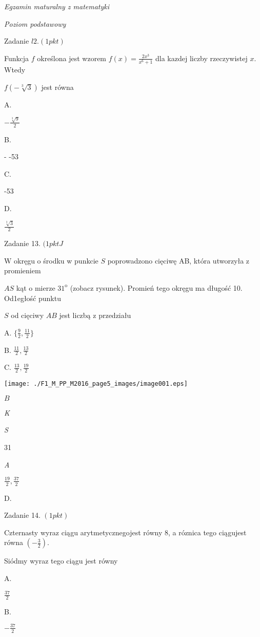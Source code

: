 \documentclass[a4paper,12pt]{article}
\begin{document}
{\it Egzamin maturalny z matematyki}

{\it Poziom podstawowy}

Zadanie $l2. (1pkt)$

Funkcja $f$ określona jest wzorem $f(x)=\displaystyle \frac{2x^{3}}{x^{6}+1}$ dla kazdej liczby rzeczywistej $x$. Wtedy

$f(-\sqrt[3]{3})$ jest równa

A.

$-\displaystyle \frac{\sqrt[3]{9}}{2}$

B.

- -53

C.

-53

D.

$\displaystyle \frac{\sqrt[3]{3}}{2}$

Zadanie 13. $(1pktJ$

$\mathrm{W}$ okręgu o środku w punkcie $S$ poprowadzono cięciwę AB, która utworzyła z promieniem

$AS$ kąt o mierze $31^{\mathrm{o}}$ (zobacz rysunek). Promień tego okręgu ma długość 10. Od1egłość punktu

$S$ od cięciwy $AB$ jest liczbą z przedziału

A. $\displaystyle \{\frac{9}{2},\frac{11}{2}\}$

B. $\displaystyle \frac{11}{2}, \displaystyle \frac{13}{2}$

C. $\displaystyle \frac{13}{2}, \displaystyle \frac{19}{2}$
\begin{center}
\texttt{[image: ./F1\_M\_PP\_M2016\_page5\_images/image001.eps]}
\end{center}
$B$

{\it K}

{\it S}

31

{\it A}

$\displaystyle \frac{19}{2}, \displaystyle \frac{37}{2}$

D.

Zadanie 14. $(1pkt)$

Czternasty wyraz ciągu arytmetycznegojest równy 8, a róznica tego ciągujest równa $(-\displaystyle \frac{3}{2}).$

Siódmy wyraz tego ciągu jest równy

A.

$\displaystyle \frac{37}{2}$

B.

$-\displaystyle \frac{37}{2}$
\end{document}
